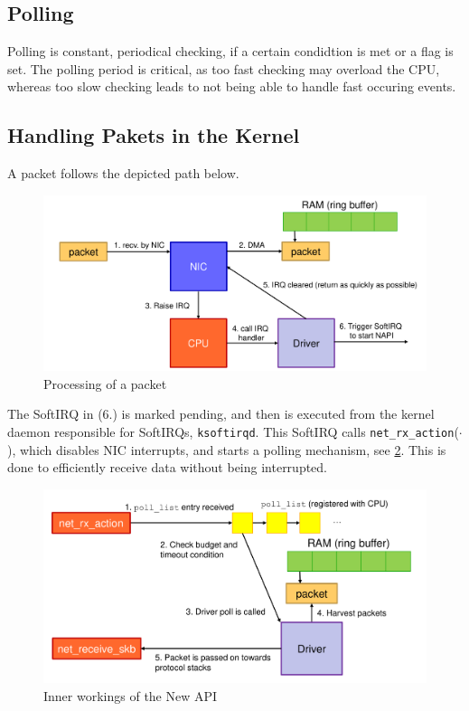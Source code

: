 \documentclass[english]{panikzettel}
\newcommand{\fkt}[1]{\texttt{#1}(\(\cdot\))}
\begin{document}
	\subsection{Polling}
	\label{ss-polling}
	
	Polling is constant, periodical checking, if a certain condidtion is met or a flag is set.
	The polling period is critical, as too fast checking may overload the CPU, whereas too slow checking leads to not being able to handle fast occuring events.

	\subsection{Handling Pakets in the Kernel}
	\label{ss-handling-pakets-in-the-kernel}
	
	A packet follows the depicted path below.

	\begin{figure}[H]
		\centering
		\includegraphics[width=\textwidth]{img/3-packets-kernel.png}
		\caption{Processing of a packet}
		\label{img-3-packets-kernel}
	\end{figure}

	The SoftIRQ in (6.) is marked pending, and then is executed from the kernel daemon responsible for SoftIRQs, \texttt{ksoftirqd}. This SoftIRQ calls \fkt{net\_rx\_action}, which disables NIC interrupts, and starts a polling mechanism, see \cref{img-3-napi}.
	This is done to efficiently receive data without being interrupted.

	\begin{figure}[H]
		\centering
		\includegraphics[width=\textwidth]{img/3-napi.png}
		\caption{Inner workings of the New API}
		\label{img-3-napi}
	\end{figure}
\end{document}
